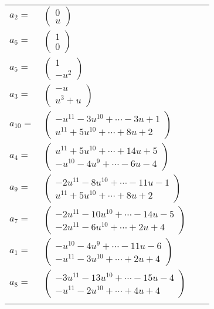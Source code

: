 \documentclass[1p]{elsarticle_modified}
\theoremstyle{definition}
\begin{document}
\begin{tabular}{m{7pt} m{180pt} m{7pt} m{180pt} }
\flushright $a_{2}=$&$\begin{pmatrix}0\\u\end{pmatrix}$ \\
\flushright $a_{6}=$&$\begin{pmatrix}1\\0\end{pmatrix}$ \\
\flushright $a_{5}=$&$\begin{pmatrix}1\\- u^2\end{pmatrix}$ \\
\flushright $a_{3}=$&$\begin{pmatrix}- u\\u^3+u\end{pmatrix}$ \\
\flushright $a_{10}=$&$\begin{pmatrix}- u^{11}-3 u^{10}+\cdots-3 u+1\\u^{11}+5 u^{10}+\cdots+8 u+2\end{pmatrix}$ \\
\flushright $a_{4}=$&$\begin{pmatrix}u^{11}+5 u^{10}+\cdots+14 u+5\\- u^{10}-4 u^9+\cdots-6 u-4\end{pmatrix}$ \\
\flushright $a_{9}=$&$\begin{pmatrix}-2 u^{11}-8 u^{10}+\cdots-11 u-1\\u^{11}+5 u^{10}+\cdots+8 u+2\end{pmatrix}$ \\
\flushright $a_{7}=$&$\begin{pmatrix}-2 u^{11}-10 u^{10}+\cdots-14 u-5\\-2 u^{11}-6 u^{10}+\cdots+2 u+4\end{pmatrix}$ \\
\flushright $a_{1}=$&$\begin{pmatrix}- u^{10}-4 u^9+\cdots-11 u-6\\- u^{11}-3 u^{10}+\cdots+2 u+4\end{pmatrix}$ \\
\flushright $a_{8}=$&$\begin{pmatrix}-3 u^{11}-13 u^{10}+\cdots-15 u-4\\- u^{11}-2 u^{10}+\cdots+4 u+4\end{pmatrix}$\\&\end{tabular}
\end{document}
